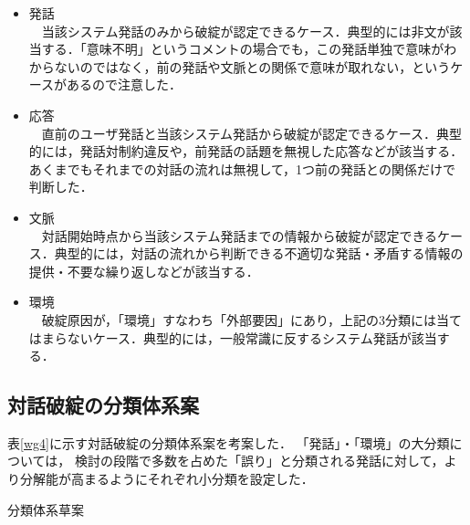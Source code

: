 \documentclass[japanese]{jnlp_1.4}
\begin{document}
\begin{itemize}
\item 発話\\
　当該システム発話のみから破綻が認定できるケース．典型的には非文が該当する．「意味不明」というコメントの場合でも，この発話単独で意味がわからないのではなく，前の発話や文脈との関係で意味が取れない，というケースがあるので注意した．

\item 応答\\
　直前のユーザ発話と当該システム発話から破綻が認定できるケース．典型的には，発話対制約違反や，前発話の話題を無視した応答などが該当する．あくまでもそれまでの対話の流れは無視して，1つ前の発話との関係だけで判断した．

\item 文脈\\
　対話開始時点から当該システム発話までの情報から破綻が認定できるケース．典型的には，対話の流れから判断できる不適切な発話・矛盾する情報の提供・不要な繰り返しなどが該当する．

\item 環境\\
　破綻原因が，「環境」すなわち「外部要因」にあり，上記の3分類には当てはまらないケース．典型的には，一般常識に反するシステム発話が該当する．
\end{itemize}


\subsection{対話破綻の分類体系案}

表\ref{wg4}に示す対話破綻の分類体系案を考案した．
「発話」・「環境」の大分類については，
検討の段階で多数を占めた「誤り」と分類される発話に対して，より分解能が高まるようにそれぞれ小分類を設定した．

\begin{table}[t]
\caption{分類体系草案}
\label{wg4}

\end{table}
\end{document}
